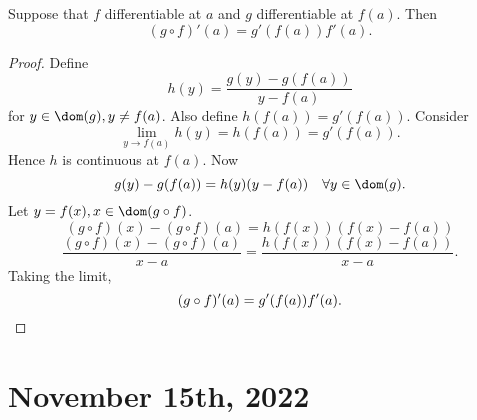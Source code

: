 \documentclass[11pt]{scrartcl}
\numberwithin{equation}{section}
\begin{document}
\begin{theorem}
    \label{thm:chain-rule}
    Suppose that $f$ differentiable at $a$ and $g$ differentiable at $f(a)$.
    Then 
    \[
        (g\circ f)'(a) = g'(f(a))f'(a).
    \]
\end{theorem}
\begin{proof}
    Define
    \[
        h(y) = \frac{g(y)-g(f(a))}{y-f(a)}
    \]
    for $y\in \dom(g), y\neq f(a)$.
    Also define $h(f(a)) = g'(f(a))$. Consider 
    \[
        \lim_{y\rightarrow f(a)}h(y) = h(f(a)) = g'(f(a)).
    \]
    Hence $h$ is continuous at $f(a)$. Now 
    \[
        g(y) - g(f(a)) = h(y)(y-f(a)) \quad \forall y\in\dom(g).
    \]
    Let $y=f(x), x\in\dom(g\circ f)$.
    \[
        (g\circ f)(x) - (g\circ f)(a) = h(f(x))(f(x)-f(a))
    \] 
    \[
        \frac{(g\circ f)(x) - (g\circ f)(a)}{x-a} = \frac{h(f(x))(f(x)-f(a))}{x-a}.
    \]
    Taking the limit,
    \[
        (g\circ f)'(a) = g'(f(a))f'(a). \qedhere
    \]
\end{proof}
\clearpage
\section{November 15th, 2022}
\end{document}
